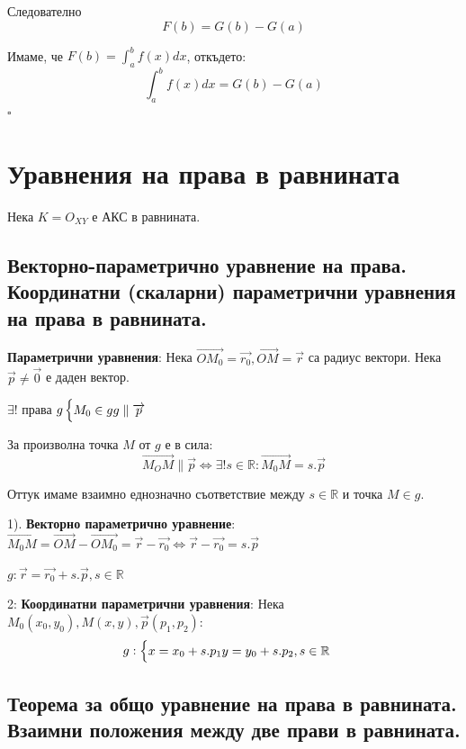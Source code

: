 \documentclass{article}
\renewcommand{\\}{\newline}
\newcommand{\proven}{\hfill $\square$}
\begin{document}
Следователно \[
  F(b) = G(b) - G(a)
\] 

Имаме, че \(F(b) = \int_{a}^{b}f(x)dx\), откъдето:  
\[
  \int_{a}^{b}f(x)dx  = G(b) - G(a)
\]      
\proven
\newpage
\section{Уравнения на права в равнината}

Нека \(K = O_{XY}\) е АКС в равнината. 

\subsection{Векторно-параметрично уравнение на права. Координатни (скаларни) параметрични уравнения на права в равнината.}

\textbf{Параметрични уравнения}: Нека \(\overrightarrow{OM_{0}} = \overrightarrow{r_0}, \overrightarrow{OM} = \overrightarrow{r}\) са радиус вектори. Нека \(\overrightarrow{p} \not= \overrightarrow{0}\) е даден вектор.

\(\exists\)! права \(g \begin{cases} M_{0} \in g \\ g \parallel \overrightarrow{p}\end{cases}\)   

За произволна точка \(M\) от \(g\) е в сила: \[
  \overrightarrow{M_{O}M} \parallel \overrightarrow{p} \iff \exists ! s \in \mathbb{R}: \overrightarrow{M_0M} = s.\overrightarrow{p}
\] 

Оттук имаме взаимно еднозначно съответствие между \(s\in \mathbb{R}\) и точка \(M \in g\). 

1). \textbf{Векторно параметрично уравнение}: \(\overrightarrow{M_{0}M} = \overrightarrow{OM} - \overrightarrow{OM_0} = \overrightarrow{r} - \overrightarrow{r_0} \iff \overrightarrow{r} - \overrightarrow{r_0} = s.\overrightarrow{p}\)  

\(g: \overrightarrow{r} = \overrightarrow{r_0} + s.\overrightarrow{p}, s \in \mathbb{R}\) 

2: \textbf{Координатни параметрични уравнения}: Нека \(M_0(x_0, y_0), M(x,y), \overrightarrow{p}(p_1, p_2)\): \[
  g: \begin{cases}
    x = x_0 + s.p_1 \\ 
    y = y_0 + s.p_2, s \in \mathbb{R}
  \end{cases}
\]  

\subsection{Теорема за общо уравнение на права в равнината. Взаимни положения между две прави в равнината.}
\end{document}
